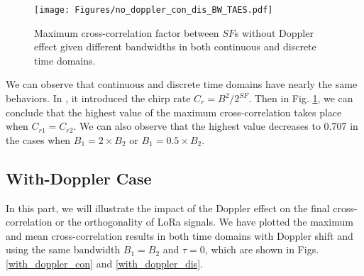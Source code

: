 \documentclass{IEEEtaes}
\theoremstyle{plain}
\begin{document}
\begin{figure}[ht]
  \centering
  \texttt{[image: Figures/no\_doppler\_con\_dis\_BW\_TAES.pdf]}
  \caption{Maximum cross-correlation factor between $SF$s without Doppler effect given different bandwidths in both continuous and discrete time domains.}
  \label{no_doppler_con_dis_BW}
\end{figure}
We can observe that continuous and discrete time domains have nearly the same behaviors. In \cite{pham2020radio}, it introduced the chirp rate $C_r = B^2/2^{SF}$. Then in Fig. \ref{no_doppler_con_dis_BW}, we can conclude that the highest value of the maximum cross-correlation takes place when $C_{r1} = C_{r2}$. We can also observe that the highest value decreases to 0.707 in the cases when $B_1 = 2\times B_2$ or $B_1  = 0.5 \times B_2$. 

\subsection{With-Doppler Case}
In this part, we will illustrate the impact of the Doppler effect on the final cross-correlation or the orthogonality of LoRa signals. We have plotted the maximum and mean cross-correlation results in both time domains with Doppler shift and using the same bandwidth $B_1=B_2$ and $\tau=0$, which are shown in Figs. \ref{with_doppler_con} and \ref{with_doppler_dis}.  
\end{document}
